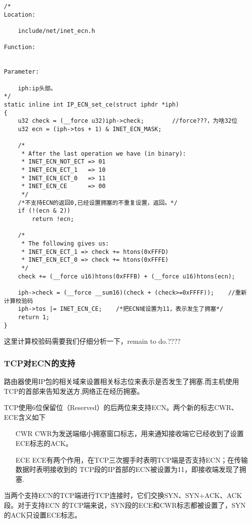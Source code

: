 \begin{verbatim}
/*
Location:

    include/net/inet_ecn.h

Function:


Parameter:

    iph:ip头部。
*/
static inline int IP_ECN_set_ce(struct iphdr *iph)
{
    u32 check = (__force u32)iph->check;        //force???，为啥32位
    u32 ecn = (iph->tos + 1) & INET_ECN_MASK;

    /*
     * After the last operation we have (in binary):
     * INET_ECN_NOT_ECT => 01
     * INET_ECN_ECT_1   => 10
     * INET_ECN_ECT_0   => 11
     * INET_ECN_CE      => 00
     */
    /*不支持ECN的返回0,已经设置拥塞的不重复设置，返回。*/
    if (!(ecn & 2))         
        return !ecn;
    
    /*
     * The following gives us:
     * INET_ECN_ECT_1 => check += htons(0xFFFD)
     * INET_ECN_ECT_0 => check += htons(0xFFFE)
     */
    check += (__force u16)htons(0xFFFB) + (__force u16)htons(ecn);
    
    iph->check = (__force __sum16)(check + (check>=0xFFFF));    //重新计算校验码
    iph->tos |= INET_ECN_CE;    /*把ECN域设置为11，表示发生了拥塞*/
    return 1;
}
\end{verbatim}

        这里计算校验码需要我们仔细分析一下，remain to do.????
        
        \subsubsection{TCP对ECN的支持}
            路由器使用IP包的相关域来设置相关标志位来表示是否发生了拥塞.而主机使用TCP的首部来告知发送方,网络正在经历拥塞。
            
            TCP使用6位保留位（Reserved）的后两位来支持ECN。两个新的标志CWR、ECE含义如下
\begin{enumerate}
\item[CWR]  CWR为发送端缩小拥塞窗口标志，用来通知接收端它已经收到了设置ECE标志的ACK。
            
\item[ECE]  ECE有两个作用，在TCP三次握手时表明TCP端是否支持ECN；在传输数据时表明接收到的
            TCP段的IP首部的ECN被设置为11，即接收端发现了拥塞.
\end{enumerate}

            当两个支持ECN的TCP端进行TCP连接时，它们交换SYN、SYN+ACK、ACK段。对于支持ECN
            的TCP端来说，SYN段的ECE和CWR标志都被设置了，SYN的ACK只设置ECE标志。

